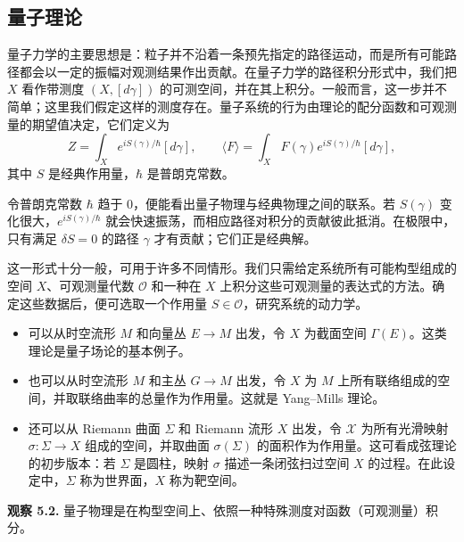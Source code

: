\subsection{量子理论}
量子力学的主要思想是：粒子并不沿着一条预先指定的路径运动，而是所有可能路径都会以一定的振幅对观测结果作出贡献。在量子力学的路径积分形式中，我们把 $X$ 看作带测度 $(X,[d\gamma])$ 的可测空间，并在其上积分。一般而言，这一步并不简单；这里我们假定这样的测度存在。量子系统的行为由理论的配分函数和可观测量的期望值决定，它们定义为
\[
  Z=\int_X e^{iS(\gamma)/\hbar}[d\gamma],\qquad
  \langle F\rangle=\int_X F(\gamma)e^{iS(\gamma)/\hbar}[d\gamma],
\]
其中 $S$ 是经典作用量，$\hbar$ 是普朗克常数。

令普朗克常数 $\hbar$ 趋于 $0$，便能看出量子物理与经典物理之间的联系。若 $S(\gamma)$ 变化很大，$e^{iS(\gamma)/\hbar}$ 就会快速振荡，而相应路径对积分的贡献彼此抵消。在极限中，只有满足 $\delta S=0$ 的路径 $\gamma$ 才有贡献；它们正是经典解。

这一形式十分一般，可用于许多不同情形。我们只需给定系统所有可能构型组成的空间 $X$、可观测量代数 $\mathcal O$ 和一种在 $X$ 上积分这些可观测量的表达式的方法。确定这些数据后，便可选取一个作用量 $S\in\mathcal O$，研究系统的动力学。
\begin{itemize}
  \item 可以从时空流形 $M$ 和向量丛 $E\to M$ 出发，令 $X$ 为截面空间 $\Gamma(E)$。这类理论是量子场论的基本例子。
  \item 也可以从时空流形 $M$ 和主丛 $G\to M$ 出发，令 $X$ 为 $M$ 上所有联络组成的空间，并取联络曲率的总量作为作用量。这就是 Yang--Mills 理论。
  \item 还可以从 Riemann 曲面 $\Sigma$ 和 Riemann 流形 $X$ 出发，令 $\mathcal X$ 为所有光滑映射 $\sigma\colon\Sigma\to X$ 组成的空间，并取曲面 $\sigma(\Sigma)$ 的面积作为作用量。这可看成弦理论的初步版本：若 $\Sigma$ 是圆柱，映射 $\sigma$ 描述一条闭弦扫过空间 $X$ 的过程。在此设定中，$\Sigma$ 称为世界面，$X$ 称为靶空间。
\end{itemize}

\begin{note}\label{note:quantum-physics-observation}
\textbf{观察 5.2.} 量子物理是在构型空间上、依照一种特殊测度对函数（可观测量）积分。
\end{note}

